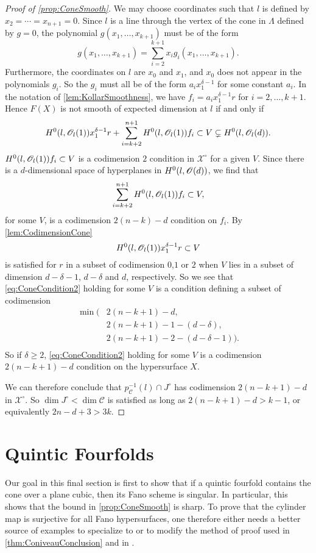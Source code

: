 \begin{proof}[Proof of \cref{prop:ConeSmooth}]
We may choose coordinates such that $l$ is defined by $x_2 = \cdots = x_{n+1} = 0$. Since $l$ is a line through the vertex of the cone in $\Lambda$ defined by $g=0$, the polynomial $g(x_1,\dots,x_{k+1})$ must be of the form
	\[g(x_1,\dots,x_{k+1}) = \sum_{i=2}^{k+1}x_ig_i(x_1,\dots,x_{k+1}).\]
	Furthermore, the coordinates on $l$ are $x_0$ and $x_1$, and $x_0$ does not appear in the polynomials $g_i$. So the $g_i$ must all be of the form $a_ix_1^{\delta-1}$ for some constant $a_i$. In the notation of \cref{lem:KollarSmoothness}, we have $f_i = a_ix_1^{\delta-1}r$ for $i=2,\dots,k+1$. Hence $F(X)$ is not smooth of expected dimension at $l$ if and only if
	\begin{equation}
		\label{eq:ConeCondition2}
		H^0(l,\mathscr{O}_l(1))x_1^{\delta-1}r + \sum_{i=k+2}^{n+1}H^0(l,\mathscr{O}_l(1))f_i \subset V \subsetneq H^0(l,\mathscr{O}_l(d)).
	\end{equation}
$H^0(l,\mathscr{O}_l(1))f_i \subset V$ is a codimension $2$ condition in $\mathscr{X}^\circ$ for a given $V$. Since there is a $d$-dimensional space of hyperplanes in $H^0(l,\mathscr{O}(d))$, we find that 
\[\sum_{i=k+2}^{n+1}H^0(l,\mathscr{O}_l(1))f_i \subset V,\]
 for some $V$, is a codimension $2(n-k)-d$ condition on $f_i$. By \cref{lem:CodimensionCone} \[H^0(l,\mathscr{O}_l(1))x_1^{\delta-1}r \subset V\]
  is satisfied for $r$ in a subset of codimension $0$,$1$ or $2$ when $V$ lies in a subset of dimension $d-\delta - 1$, $d-\delta$ and $d$, respectively. So we see that \eqref{eq:ConeCondition2} holding for some $V$ is a condition defining a subset of codimension 
  \begin{align*}
  	\min(&2(n-k+1)-d,\\
  	     &2(n-k+1)-1-(d-\delta),\\
  	     &2(n-k+1)-2-(d-\delta-1)).\\
  \end{align*}
So if $\delta \geq 2$, \eqref{eq:ConeCondition2} holding for some $V$ is a codimension $2(n-k+1)-d$ condition on the hypersurface $X$.

We can therefore conclude that $p^{-1}_{\mathcal{C}}(l) \cap J^\circ$ has codimension $2(n-k+1)-d$ in $\mathscr{X}^\circ$. So $\dim J^\circ < \dim \mathcal{C}$ is satisfied as long as $2(n-k+1)-d > k-1$, or equivalently $2n-d + 3 > 3k$.
\end{proof}



\section{Quintic Fourfolds}
Our goal in this final section is first to show that if a quintic fourfold contains the cone over a plane cubic, then its Fano scheme is singular. In particular, this shows that the bound in \cref{prop:ConeSmooth} is sharp. To prove that the cylinder map is surjective for all Fano hypersurfaces, one therefore either needs a better source of examples to specialize to or to modify the method of proof used in \cref{thm:ConiveauConclusion} and in \cite[Theorem 1.13]{VoisinConiveauThreefolds}.

